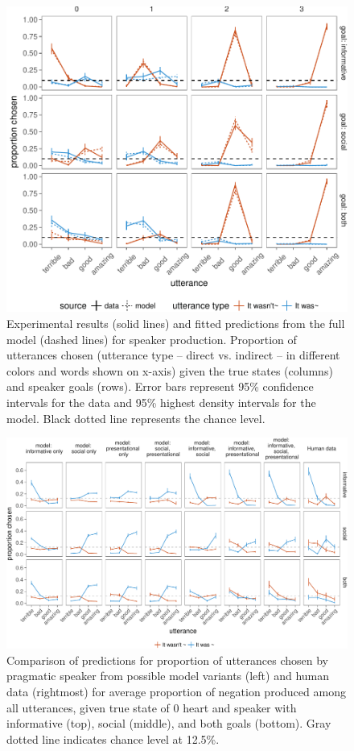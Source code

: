\documentclass[12pt]{article}
\begin{document}
\begin{figure}[!h]
\includegraphics[width=\textwidth]{polite_manuscript_files/figure-latex/utterance-1} \caption{Experimental results (solid lines) and fitted predictions from the full model (dashed lines) for speaker production. Proportion of utterances chosen (utterance type – direct vs. indirect – in different colors and words shown on x-axis) given the true states (columns) and speaker goals (rows). Error bars represent 95\% confidence intervals for the data and 95\% highest density intervals for the model. Black dotted line represents the chance level.}\label{fig:utterance}
\end{figure}

\begin{figure}[!h]
\includegraphics[width=\textwidth]{polite_manuscript_files/figure-latex/comparisonAll-1} \caption{Comparison of predictions for proportion of utterances chosen by pragmatic speaker from possible model variants (left) and human data (rightmost) for average proportion of negation produced among all utterances, given true state of 0 heart and speaker with informative (top), social (middle), and both goals (bottom). Gray dotted line indicates chance level at 12.5\%.}\label{fig:comparisonAll}
\end{figure}
\end{document}

